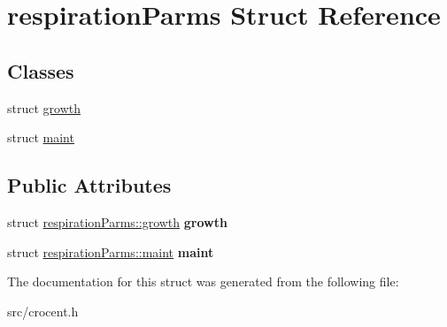\hypertarget{structrespiration_parms}{\section{respiration\-Parms Struct Reference}
\label{structrespiration_parms}
}
\subsection*{Classes}
\begin{DoxyCompactItemize}
\item 
struct \hyperlink{structrespiration_parms_1_1growth}{growth}
\item 
struct \hyperlink{structrespiration_parms_1_1maint}{maint}
\end{DoxyCompactItemize}
\subsection*{Public Attributes}
\begin{DoxyCompactItemize}
\item 
\hypertarget{structrespiration_parms_a6fe8001d84e4d8f8149982a3104d5159}{struct \hyperlink{structrespiration_parms_1_1growth}{respiration\-Parms\-::growth} {\bfseries growth}}\label{structrespiration_parms_a6fe8001d84e4d8f8149982a3104d5159}

\item 
\hypertarget{structrespiration_parms_a2250fd5e5d5f55ded70e279417d71daf}{struct \hyperlink{structrespiration_parms_1_1maint}{respiration\-Parms\-::maint} {\bfseries maint}}\label{structrespiration_parms_a2250fd5e5d5f55ded70e279417d71daf}

\end{DoxyCompactItemize}


The documentation for this struct was generated from the following file\-:\begin{DoxyCompactItemize}
\item 
src/crocent.\-h\end{DoxyCompactItemize}
